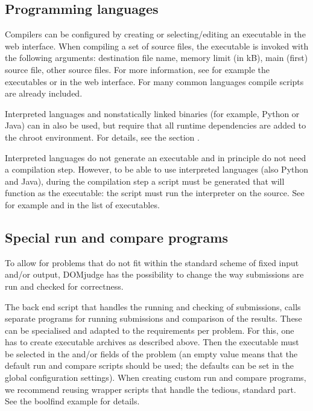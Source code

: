 \documentclass[a4paper,10pt,english,openany]{sphinxmanual}
\begin{document}
\subsection{Programming languages}
\label{\detokenize{config-advanced:programming-languages}}
\sphinxAtStartPar
Compilers can be configured by creating or selecting/editing an executable in
the web interface. When compiling a set of source files, the 
executable is invoked with the following arguments: destination file name,
memory limit (in kB), main (first) source file, other source files.
For more information, see for example the executables  or
 in the web interface. For many common languages
compile scripts are already included.

\sphinxAtStartPar
Interpreted languages and non\sphinxhyphen{}statically linked binaries (for example,
Python or Java) can in also be used, but require that all
runtime dependencies are added to the chroot environment. For details,
see the section {\hyperref[\detokenize{install-judgehost:make-chroot}]{}}.

\sphinxAtStartPar
Interpreted languages do not generate an executable and in principle
do not need a compilation step. However, to be able to use interpreted
languages (also Python and Java), during the compilation step a script
must be generated that will function as the executable: the script
must run the interpreter on the source. See for example 
and  in the list of executables.


\subsection{Special run and compare programs}
\label{\detokenize{config-advanced:special-run-and-compare-programs}}
\sphinxAtStartPar
To allow for problems that do not fit within the standard scheme of
fixed input and/or output, DOMjudge has the possibility to change the
way submissions are run and checked for correctness.

\sphinxAtStartPar
The back end script  that handles
the running and checking of submissions, calls separate programs
for running submissions and comparison of the results. These can be
specialised and adapted to the requirements per problem. For this, one
has to create executable archives as described above.
Then the executable must be
selected in the  and/or 
fields of the problem (an empty value means that the default run and
compare scripts should be used; the defaults can be set in the global
configuration settings). When creating custom run and compare
programs, we recommend re\sphinxhyphen{}using wrapper scripts that handle the
tedious, standard part. See the boolfind example for details.
\end{document}
